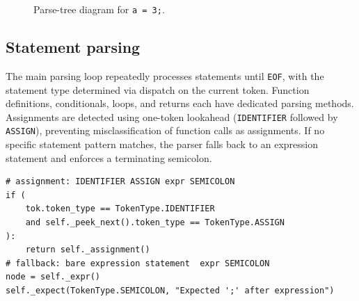 \begin{figure}[H]
\centering
{}
\caption{Parse-tree diagram for \texttt{a = 3;}.}
\label{fig:tiny-parse-tree}
\end{figure}

\subsection{Statement parsing}
The main parsing loop repeatedly processes statements until \texttt{EOF}, with
the statement type determined via dispatch on the current token. Function
definitions, conditionals, loops, and returns each have dedicated parsing
methods. Assignments are detected using one-token lookahead
(\texttt{IDENTIFIER} followed by \texttt{ASSIGN}), preventing misclassification
of function calls as assignments. If no specific statement pattern matches, the
parser falls back to an expression statement and enforces a terminating
semicolon.

\begin{lstlisting}
# assignment: IDENTIFIER ASSIGN expr SEMICOLON
if (
    tok.token_type == TokenType.IDENTIFIER
    and self._peek_next().token_type == TokenType.ASSIGN
):
    return self._assignment()
# fallback: bare expression statement  expr SEMICOLON
node = self._expr()
self._expect(TokenType.SEMICOLON, "Expected ';' after expression")
\end{lstlisting}

